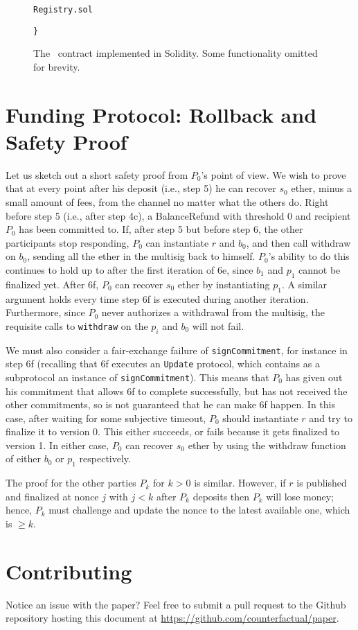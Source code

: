 \documentclass[prb,floatfix,reprint,nofootinbib,amsmath,amssymb,epsfig,pre,floats,letterpaper,groupedaffiliation,tightenlines,allcolors=blue,11pt]{revtex4}
\theoremstyle{definition}
\theoremstyle{definition}
\theoremstyle{definition}
\begin{document}
\begin{appendix}
\begin{figure}[H]
\begin{soliditysnippet}{\texttt{Registry.sol}}
\begin{lstlisting}[language=Solidity]
}
      \end{lstlisting}
      \end{soliditysnippet}
      \caption{The \registry\ contract implemented in Solidity. Some functionality omitted for brevity.}
      \label{figure:reification}
      \end{figure}

\newpage
\section{Funding Protocol: Rollback and Safety Proof}
\label{sec:safetyproof}

Let us sketch out a short safety proof from $P_0$'s point of view. We wish to prove that at every point after his deposit (i.e., step 5) he can recover $s_0$ ether, minus a small amount of fees, from the channel no matter what the others do. Right before step 5 (i.e., after step 4c), a BalanceRefund with threshold 0 and recipient $P_0$ has been committed to. If, after step 5 but before step 6, the other participants stop responding, $P_0$ can instantiate $r$ and $b_0$, and then call withdraw on $b_0$, sending all the ether in the multisig back to himself. $P_0$'s ability to do this continues to hold up to after the first iteration of 6e, since $b_1$ and $p_1$ cannot be finalized yet. After 6f, $P_0$ can recover $s_0$ ether by instantiating $p_1$. A similar argument holds every time step 6f is executed during another iteration. Furthermore, since $P_0$ never authorizes a withdrawal from the multisig, the requisite calls to \texttt{withdraw} on the $p_i$ and $b_0$ will not fail.

We must also consider a fair-exchange failure of \texttt{signCommitment}, for instance in step 6f (recalling that 6f executes an \texttt{Update} protocol, which contains as a subprotocol an instance of \texttt{signCommitment}). This means that $P_0$ has given out his commitment that allows 6f to complete successfully, but has not received the other commitments, so is not guaranteed that he can make 6f happen. In this case, after waiting for some subjective timeout, $P_0$ should instantiate $r$ and try to finalize it to version 0. This either succeeds, or fails because it gets finalized to version 1. In either case, $P_0$ can recover $s_0$ ether by using the withdraw function of either $b_0$ or $p_1$ respectively.

The proof for the other parties $P_k$ for $k > 0$ is similar. However, if $r$ is published and finalized at nonce $j$ with $j  < k$ after $P_k$ deposits then $P_k$ will lose money; hence, $P_k$ must challenge and update the nonce to the latest available one, which is $\ge k$.

\end{appendix}

\section{Contributing}
Notice an issue with the paper? Feel free to submit a pull request to the Github repository hosting this document at \url{https://github.com/counterfactual/paper}.
\end{document}
